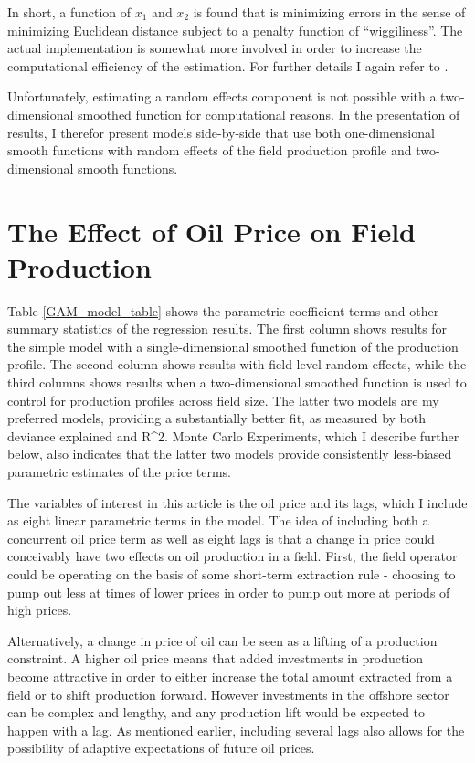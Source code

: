 \documentclass[11pt]{article}
\begin{document}
In short, a function of $x_1$ and $x_2$ is found that is minimizing errors in the sense of minimizing Euclidean distance subject to a penalty function of “wiggiliness”.  The actual implementation is somewhat more involved in order to increase the computational efficiency of the estimation.  For further details I again refer to \citet{wood_thin_2003}. 

Unfortunately, estimating a random effects component is not possible with a two-dimensional smoothed function for computational reasons.  In the presentation of results, I therefor present models side-by-side that use both one-dimensional smooth functions with random effects of the field production profile and two-dimensional smooth functions.

\section{The Effect of Oil Price on Field Production}

Table \ref{GAM_model_table} shows the parametric coefficient terms and other summary statistics of the regression results.  The first column shows results for the simple model with a single-dimensional smoothed function of the production profile.  The second column shows results with field-level random effects, while the third columns shows results when a two-dimensional smoothed function is used to control for production profiles across field size. The latter two models are my preferred models, providing a substantially better fit, as measured by both deviance explained and R^2. Monte Carlo Experiments, which I describe further below, also indicates that the latter two models provide consistently less-biased parametric estimates of the price terms.  

The variables of interest in this article is the oil price and its lags, which I include as eight linear parametric terms in the model.  The idea of including both a concurrent oil price term as well as eight lags is that a change in price could conceivably have two effects on oil production in a field.  First, the field operator could be operating on the basis of some short-term extraction rule - choosing to pump out less at times of lower prices in order to pump out more at periods of high prices.  

Alternatively, a change in price of oil can be seen as a lifting of a production constraint.  A higher oil price means that added investments in production become attractive in order to either increase the total amount extracted from a field or to shift production forward.  However investments in the offshore sector can be complex and lengthy, and any production lift would be expected to happen with a lag.  As mentioned earlier, including several lags also allows for the possibility of adaptive expectations of future oil prices.  
\end{document}
